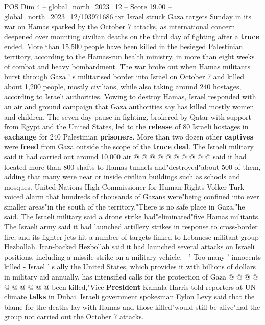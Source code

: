 \begin{textsample}{POS Dim 4 – global\_north\_2023\_12 – Score 19.00 – global\_north\_2023\_12/103971686.txt}  \label{ex:f4_pos_313}
Israel struck Gaza targets Sunday in its war on Hamas sparked by the October 7 attacks, as international concern deepened over mounting civilian deaths on the third day of fighting after a \textbf{truce} ended.
More than 15,500 people have been killed in the besieged Palestinian territory, according to the Hamas-run health ministry, in more than eight weeks of combat and heavy bombardment.
The war broke out when Hamas militants burst through Gaza ' s militarised border into Israel on October 7 and killed about 1,200 people, mostly civilians, while also taking around 240 hostages, according to Israeli authorities.
Vowing to destroy Hamas, Israel responded with an air and ground campaign that Gaza authorities say has killed mostly women and children.
The seven-day pause in fighting, brokered by Qatar with support from Egypt and the United States, led to the \textbf{release} of 80 Israeli hostages in \textbf{exchange} for 240 Palestinian \textbf{prisoners}.
More than two dozen other \textbf{captives} were \textbf{freed} from Gaza outside the scope of the \textbf{truce} \textbf{deal}.
The Israeli military said it had carried out around 10,000 air @ @ @ @ @ @ @ @ @ @ said it had located more than 800 shafts to Hamas tunnels and"destroyed"about 500 of them, adding that many were near or inside civilian buildings such as schools and mosques.
United Nations High Commissioner for Human Rights Volker Turk voiced alarm that hundreds of thousands of Gazans were"being confined into ever smaller areas"in the south of the territory."There is no safe place in Gaza,"he said.
The Israeli military said a drone strike had"eliminated"five Hamas militants.
The Israeli army said it had launched artillery strikes in response to cross-border fire, and its fighter jets hit a number of targets linked to Lebanese militant group Hezbollah.
Iran-backed Hezbollah said it had launched several attacks on Israeli positions, including a missile strike on a military vehicle. - ' Too many ' innocents killed - Israel ' s ally the United States, which provides it with billions of dollars in military aid annually, has intensified calls for the protection of Gaza @ @ @ @ @ @ @ @ @ @ been killed,"Vice \textbf{President} Kamala Harris told reporters at UN climate \textbf{talks} in Dubai.
Israeli government spokesman Eylon Levy said that the blame for the deaths lay with Hamas and those killed"would still be alive"had the group not carried out the October 7 attacks.

\end{textsample}
